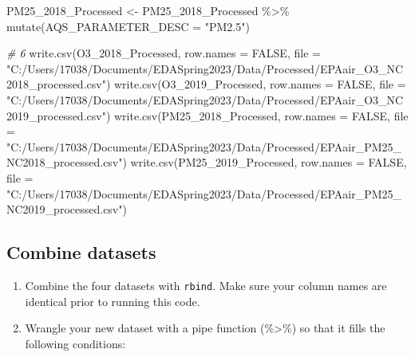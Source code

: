 \documentclass[
]{article}
\newenvironment{Shaded}{\begin{snugshade}}{\end{snugshade}}
\newcommand{\AttributeTok}[1]{\textcolor[rgb]{0.77,0.63,0.00}{#1}}
\newcommand{\CommentTok}[1]{\textcolor[rgb]{0.56,0.35,0.01}{\textit{#1}}}
\newcommand{\ConstantTok}[1]{\textcolor[rgb]{0.00,0.00,0.00}{#1}}
\newcommand{\FunctionTok}[1]{\textcolor[rgb]{0.00,0.00,0.00}{#1}}
\newcommand{\NormalTok}[1]{#1}
\newcommand{\OtherTok}[1]{\textcolor[rgb]{0.56,0.35,0.01}{#1}}
\newcommand{\SpecialCharTok}[1]{\textcolor[rgb]{0.00,0.00,0.00}{#1}}
\newcommand{\StringTok}[1]{\textcolor[rgb]{0.31,0.60,0.02}{#1}}
\begin{document}
\begin{Shaded}
\begin{Highlighting}[]
\NormalTok{PM25\_2018\_Processed }\OtherTok{\textless{}{-}}\NormalTok{ PM25\_2018\_Processed }\SpecialCharTok{\%\textgreater{}\%}
    \FunctionTok{mutate}\NormalTok{(}\AttributeTok{AQS\_PARAMETER\_DESC =} \StringTok{"PM2.5"}\NormalTok{)}

\CommentTok{\# 6}
\FunctionTok{write.csv}\NormalTok{(O3\_2018\_Processed, }\AttributeTok{row.names =} \ConstantTok{FALSE}\NormalTok{, }\AttributeTok{file =} \StringTok{"C:/Users/17038/Documents/EDASpring2023/Data/Processed/EPAair\_O3\_NC2018\_processed.csv"}\NormalTok{)}
\FunctionTok{write.csv}\NormalTok{(O3\_2019\_Processed, }\AttributeTok{row.names =} \ConstantTok{FALSE}\NormalTok{, }\AttributeTok{file =} \StringTok{"C:/Users/17038/Documents/EDASpring2023/Data/Processed/EPAair\_O3\_NC2019\_processed.csv"}\NormalTok{)}
\FunctionTok{write.csv}\NormalTok{(PM25\_2018\_Processed, }\AttributeTok{row.names =} \ConstantTok{FALSE}\NormalTok{, }\AttributeTok{file =} \StringTok{"C:/Users/17038/Documents/EDASpring2023/Data/Processed/EPAair\_PM25\_NC2018\_processed.csv"}\NormalTok{)}
\FunctionTok{write.csv}\NormalTok{(PM25\_2019\_Processed, }\AttributeTok{row.names =} \ConstantTok{FALSE}\NormalTok{, }\AttributeTok{file =} \StringTok{"C:/Users/17038/Documents/EDASpring2023/Data/Processed/EPAair\_PM25\_NC2019\_processed.csv"}\NormalTok{)}
\end{Highlighting}
\end{Shaded}

\hypertarget{combine-datasets}{%
\subsection{Combine datasets}\label{combine-datasets}}

\begin{enumerate}
\def\labelenumi{\arabic{enumi}.}
\setcounter{enumi}{6}
\item
  Combine the four datasets with \texttt{rbind}. Make sure your column
  names are identical prior to running this code.
\item
  Wrangle your new dataset with a pipe function (\%\textgreater\%) so
  that it fills the following conditions:
\end{enumerate}
\end{document}
